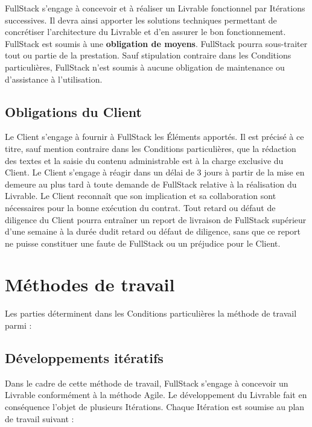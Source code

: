 \documentclass[11pt]{article}
\begin{document}
FullStack s’engage à concevoir et à réaliser un Livrable fonctionnel par Itérations successives. Il devra ainsi apporter les solutions techniques permettant de concrétiser l’architecture du Livrable et d’en assurer le bon fonctionnement. FullStack est soumis à une \textbf{obligation de moyens}. FullStack pourra sous-traiter tout ou partie de la prestation. Sauf stipulation contraire dans les Conditions particulières, FullStack n’est soumis à aucune obligation de maintenance ou d’assistance à l’utilisation.

\subsection{Obligations du Client}

Le Client s’engage à fournir à FullStack les Éléments apportés. Il est précisé à ce titre, sauf mention contraire dans les Conditions particulières, que la rédaction des textes et la saisie du contenu administrable est à la charge exclusive du Client. Le Client s’engage à réagir dans un délai de 3 jours à partir de la mise en demeure au plus tard à toute demande de FullStack relative à la réalisation du Livrable. Le Client reconnaît que son implication et sa collaboration sont nécessaires pour la bonne exécution du contrat. Tout retard ou défaut de diligence du Client pourra entraîner un report de livraison de FullStack supérieur d’une semaine à la durée dudit retard ou défaut de diligence, sans que ce report ne puisse constituer une faute de FullStack ou un préjudice pour le Client.

\section{Méthodes de travail}

Les parties déterminent dans les Conditions particulières la méthode de travail parmi :

\subsection{Développements itératifs}

Dans le cadre de cette méthode de travail, FullStack s’engage à concevoir un Livrable conformément à la méthode Agile. Le développement du Livrable fait en conséquence l’objet de plusieurs Itérations. Chaque Itération est soumise au plan de travail suivant :
\end{document}

